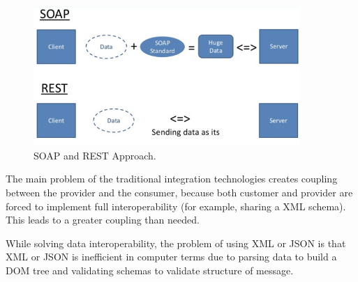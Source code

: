 \begin{figure}[!htb]
  \centering
  \includegraphics[width=0.9\textwidth]{Figures/soap-rest.png}
  \caption[SOAP and REST Approach.]{SOAP and REST Approach.}
  \label{fig:soaprest}
\end{figure}

The main problem of the traditional integration technologies creates coupling between the provider and the consumer, because both customer and provider are forced to implement full interoperability (for example, sharing a XML schema). This leads to a greater coupling than needed.

While solving data interoperability, the problem of using XML or JSON is that XML or JSON is inefficient in computer terms due to parsing data to build a DOM tree and validating schemas to validate structure of message.

